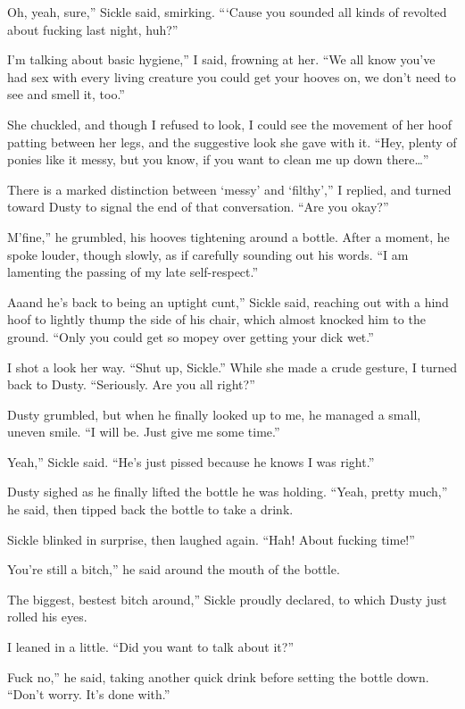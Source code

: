 \leavevmode{}Oh, yeah, sure,” Sickle said, smirking. “‘Cause you sounded all kinds of revolted about fucking last night, huh?”

\leavevmode{}I’m talking about basic hygiene,” I said, frowning at her. “We all know you’ve had sex with every living creature you could get your hooves on, we don’t need to see and smell it, too.”

She chuckled, and though I refused to look, I could see the movement of her hoof patting between her legs, and the suggestive look she gave with it. “Hey, plenty of ponies like it messy, but you know, if you want to clean me up down there…”

\leavevmode{}There is a marked distinction between ‘messy’ and ‘filthy’,” I replied, and turned toward Dusty to signal the end of that conversation. “Are you okay?”

\leavevmode{}M’fine,” he grumbled, his hooves tightening around a bottle. After a moment, he spoke louder, though slowly, as if carefully sounding out his words. “I am lamenting the passing of my late self-respect.”

\leavevmode{}Aaand he’s back to being an uptight cunt,” Sickle said, reaching out with a hind hoof to lightly thump the side of his chair, which almost knocked him to the ground. “Only you could get so mopey over getting your dick wet.”

I shot a look her way. “Shut up, Sickle.” While she made a crude gesture, I turned back to Dusty. “Seriously. Are you all right?”

Dusty grumbled, but when he finally looked up to me, he managed a small, uneven smile. “I will be. Just give me some time.”

\leavevmode{}Yeah,” Sickle said. “He’s just pissed because he knows I was right.”

Dusty sighed as he finally lifted the bottle he was holding. “Yeah, pretty much,” he said, then tipped back the bottle to take a drink.

Sickle blinked in surprise, then laughed again. “Hah! About fucking time!”

\leavevmode{}You’re still a bitch,” he said around the mouth of the bottle.

\leavevmode{}The biggest, bestest bitch around,” Sickle proudly declared, to which Dusty just rolled his eyes.

I leaned in a little. “Did you want to talk about it?”

\leavevmode{}Fuck no,” he said, taking another quick drink before setting the bottle down. “Don’t worry. It’s done with.”

